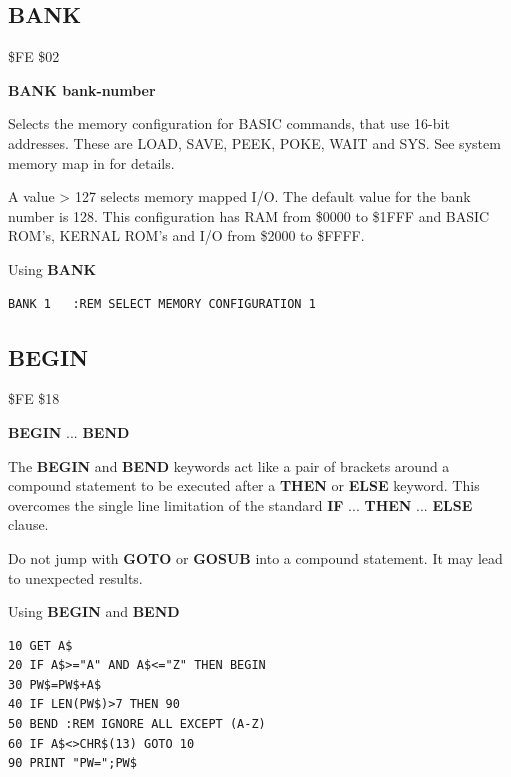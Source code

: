 
\newpage
\subsection{BANK}
\begin{description}[leftmargin=2cm,style=nextline]
\item [Token:] \$FE \$02
\item [Format:] {\bf BANK bank-number}
\item [Usage:] Selects the memory configuration
               for BASIC commands, that use 16-bit addresses.
               These are LOAD, SAVE, PEEK, POKE, WAIT and SYS.
               See system memory map in  for details.
\item [Remarks:] A value > 127 selects memory mapped I/O.
                 The default value for the bank number is 128.
                 This configuration has RAM from \$0000 to \$1FFF
                 and BASIC ROM's, KERNAL ROM's and I/O from \$2000 to \$FFFF.
\item [Example:] Using {\bf BANK}
\begin{tcolorbox}[colback=black,coltext=white]
\verbatimfont{\codefont}
\begin{verbatim}
BANK 1   :REM SELECT MEMORY CONFIGURATION 1
\end{verbatim}
\end{tcolorbox}
\end{description}


\newpage
\subsection{BEGIN}
\begin{description}[leftmargin=2cm,style=nextline]
\item [Token:] \$FE \$18
\item [Format:] {\bf BEGIN} ... {\bf BEND}
\item [Usage:] The {\bf BEGIN} and {\bf BEND} keywords act like
               a pair of brackets around a compound statement
               to be executed after a {\bf THEN} or {\bf ELSE} keyword.
               This overcomes the single line limitation of the
               standard {\bf IF} ... {\bf THEN} ... {\bf ELSE} clause.
\item [Remarks:] Do not jump with {\bf GOTO} or {\bf GOSUB} into a
                 compound statement. It may lead to unexpected
                 results.
\item [Example:] Using {\bf BEGIN} and {\bf BEND}
\begin{tcolorbox}[colback=black,coltext=white]
\verbatimfont{\codefont}
\begin{verbatim}
10 GET A$
20 IF A$>="A" AND A$<="Z" THEN BEGIN
30 PW$=PW$+A$
40 IF LEN(PW$)>7 THEN 90
50 BEND :REM IGNORE ALL EXCEPT (A-Z)
60 IF A$<>CHR$(13) GOTO 10
90 PRINT "PW=";PW$
\end{verbatim}
\end{tcolorbox}
\end{description}

